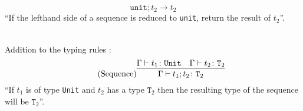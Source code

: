 \begin{equation*}
    \tag{Sequence Next}
    \texttt{unit} ; t_2 \rightarrow t_2
\end{equation*}
``If the lefthand side of a sequence is reduced to \texttt{unit},
return the result of $t_2$''.

~\\
Addition to the typing rules \cite{pierce2002ProgLang}:
\begin{equation*}
    \tag{Sequence}
    \infer{
        \Gamma \vdash t_1 ; t_2 \colon \texttt{T}_2
    }{
        \Gamma \vdash t_1 \colon \texttt{Unit} & \Gamma \vdash t_2 \colon \texttt{T}_2
    }
\end{equation*}
``If $t_1$ is of type \texttt{Unit} and $t_2$ has a type $\texttt{T}_2$ then
the resulting type of the sequence will be $\texttt{T}_2$''.
